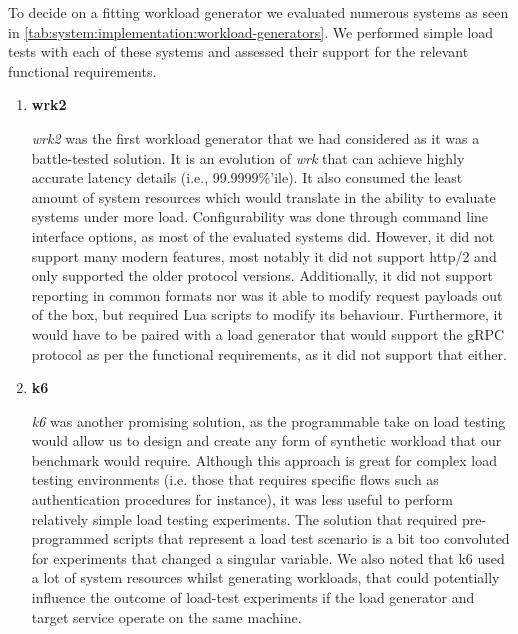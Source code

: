 

To decide on a fitting workload generator we evaluated numerous systems as seen in \cref{tab:system:implementation:workload-generators}. We performed simple load tests with each of these systems and assessed their support for the relevant functional requirements. 


\begin{enumerate}[label=\textbf{WG\arabic*}, leftmargin=3\parindent]
   
    \item \textbf{wrk2}
    \label{wg-1}
    
    \textit{wrk2} was the first workload generator that we had considered as it was a battle-tested solution. It is an evolution of \textit{wrk} that can achieve highly accurate latency details (i.e., 99.9999\%'ile). It also consumed the least amount of system resources which would translate in the ability to evaluate systems under more load. Configurability was done through command line interface options, as most of the evaluated systems did. However, it did not support many modern features, most notably it did not support http/2 and only supported the older protocol versions. Additionally, it did not support reporting in common formats nor was it able to modify request payloads out of the box, but required Lua scripts to modify its behaviour. Furthermore, it would have to be paired with a load generator that would support the gRPC protocol as per the functional requirements, as it did not support that either.    

    \item \textbf{k6}
    \label{wg-2}
    
    \textit{k6} was another promising solution, as the programmable take on load testing would allow us to design and create any form of synthetic workload that our benchmark would require. Although this approach is great for complex load testing environments (i.e. those that requires specific flows such as authentication procedures for instance), it was less useful to perform relatively simple load testing experiments. The solution that required pre-programmed scripts that represent a load test scenario is a bit too convoluted for experiments that changed a singular variable. We also noted that k6 used a lot of system resources whilst generating workloads, that could potentially influence the outcome of load-test experiments if the load generator and target service operate on the same machine.


\end{enumerate}
